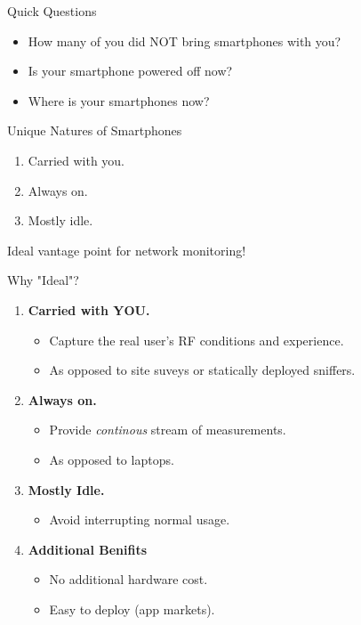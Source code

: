 \begin{frame}{Quick Questions}
  \begin{itemize}
    \item How many of you did NOT bring smartphones with you?
    \item Is your smartphone powered off now?
    \item Where is your smartphones now?
  \end{itemize}
  \begin{block}{Unique Natures of Smartphones}
    \begin{enumerate}
      \item Carried with you.
      \item Always on.
      \item Mostly idle.
    \end{enumerate}
  \end{block}
  \vspace*{5mm}
  {\LARGE Ideal vantage point for network monitoring!}
\end{frame}

\begin{frame}{Why "Ideal"?}
  \begin{enumerate}
    \item \textbf{Carried with YOU.}
      \begin{itemize}
        \item Capture the real user's RF conditions and experience.
        \item As opposed to site suveys or statically deployed sniffers.
      \end{itemize}
    \item \textbf{Always on.}
      \begin{itemize}
        \item Provide \textit{continous} stream of measurements.
        \item As opposed to laptops.
      \end{itemize}
    \item \textbf{Mostly Idle.}
      \begin{itemize}
        \item Avoid interrupting normal usage.
      \end{itemize}
    \item \textbf{Additional Benifits}
      \begin{itemize}
        \item No additional hardware cost.
        \item Easy to deploy (app markets).
      \end{itemize}
  \end{enumerate}
\end{frame}

